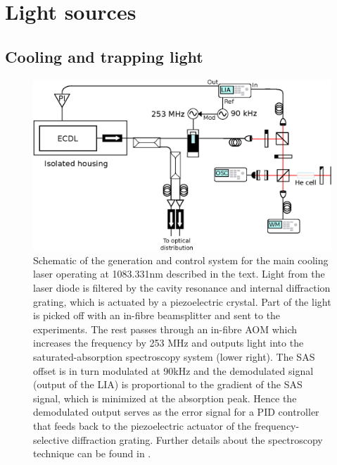 \section{Light sources}\label{ssec:lasers}
\subsection*{Cooling and trapping light}
	
	\begin{figure}
		\centering
		\includegraphics[width=\textwidth]{fig/apparatus/master_laser_system}
		\caption{Schematic of the generation and control system for the main cooling laser operating at 1083.331nm described in the text. Light from the laser diode is filtered by the cavity resonance and internal diffraction grating, which is actuated by a piezoelectric crystal. Part of the light is picked off with an in-fibre beamsplitter and sent to the experiments. The rest passes through an in-fibre AOM which increases the frequency by 253 MHz and outputs light into the saturated-absorption spectroscopy system (lower right). The SAS offset is in turn modulated at 90kHz and the demodulated signal (output of the LIA) is proportional to the gradient of the SAS signal, which is minimized at the absorption peak. Hence the demodulated output serves as the error signal for a PID controller that feeds back to the piezoelectric actuator of the frequency-selective diffraction grating. Further details about the spectroscopy technique can be found in \cite{ShinThesis,FootAtomic}.}
		\label{fig:main_laser}
	\end{figure}
	
